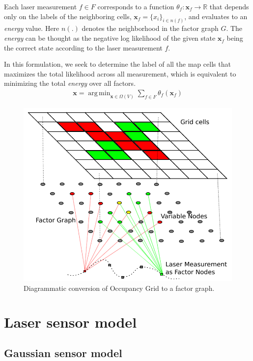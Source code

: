 \documentclass[letterpaper, 10 pt, conference]{ieeeconf} %
\DeclareMathOperator*{\argmin}{arg\,min}
\newcommand{\vect}[1]{\mathbf{#1}}
\newcommand{\field}[1]{\mathbb{#1}}
\newcommand{\Real}[0]{\field{R}}
\begin{document}
Each laser measurement $f \in F$ corresponds to a function $\theta_f : \vect{x}_f \rightarrow \Real$ 
that depends only on the labels of the neighboring cells, $\vect{x}_f = \{x_i\}_{i
\in n(f)}$, and evaluates to an
\emph{energy} value. Here $n(.)$ denotes the neighborhood in the factor graph $G$.
The \emph{energy} can be thought as the negative log likelihood of the given
state $\vect{x}_f$ being the correct state according to the laser measurement $f$.

In this formulation, we seek to determine the label of all the map cells that
maximizes the total likelihood across all measurement, which is equivalent to
minimizing the total \emph{energy} over all factors.
\begin{align}
  \vect{x} = \argmin_{\vect{x} \in \Omega(V)} \sum_{f \in F} \theta_f(\vect{x}_f)
\end{align}
\begin{figure}
  \includegraphics[width=\columnwidth]{../figures/factorgraph/factorgraph.pdf}
  \caption{Diagrammatic conversion of Occupancy Grid to a factor graph.}
  \label{fig:factor-graph}
\end{figure}

\section{Laser sensor model}
\subsection{Gaussian sensor model}
\end{document}
